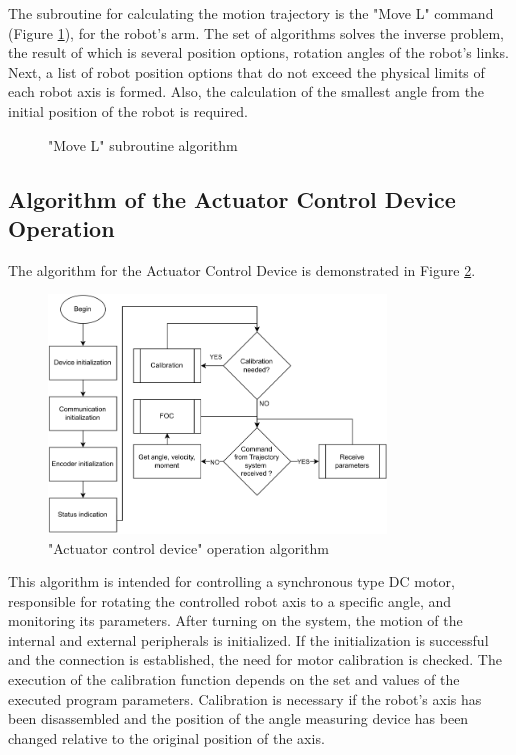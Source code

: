 The subroutine for calculating the motion trajectory is the "Move L" command (Figure \ref{AlgL}), for the robot's arm. The set of algorithms solves the inverse problem, the result of which is several position options, rotation angles of the robot's links. Next, a list of robot position options that do not exceed the physical limits of each robot axis is formed. Also, the calculation of the smallest angle from the initial position of the robot is required.

\begin{figure}[H]
	\centering
	
	\caption{"Move L" subroutine algorithm}
	\label{AlgL}
\end{figure}

\subsection{Algorithm of the Actuator Control Device Operation}

The algorithm for the Actuator Control Device is demonstrated in Figure \ref{AlgACD}. 


\begin{figure}[H]
	\centering
	\includegraphics[width=0.8\textwidth]{Src/images/acdalg.png}
	\caption{"Actuator control device" operation algorithm}
	\label{AlgACD}
\end{figure}
This algorithm is intended for controlling a synchronous type DC motor, responsible for rotating the controlled robot axis to a specific angle, and monitoring its parameters. After turning on the system, the motion of the internal and external peripherals is initialized. If the initialization is successful and the connection is established, the need for motor calibration is checked. The execution of the calibration function depends on the set and values of the executed program parameters. Calibration is necessary if the robot's axis has been disassembled and the position of the angle measuring device has been changed relative to the original position of the axis.


